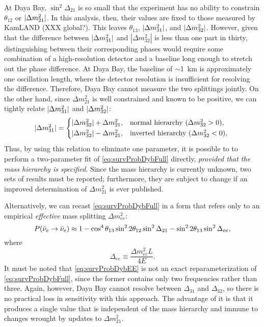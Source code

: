 \documentclass[../thesis.tex]{subfiles}
\begin{document}
At Daya Bay, \(\sin^2 \Delta_{21}\) is so small that the experiment has no ability to constrain $\theta_{12}$ or \(\lvert \Delta m^2_{21}\rvert\). In this analysis, then, their values are fixed to those measured by KamLAND (XXX global?). This leaves $\theta_{13}$, \(\lvert \Delta m^2_{31}\rvert\), and \(\lvert \Delta m^2_{32}\rvert\). However, given that the difference between \(\lvert \Delta m^2_{31}\rvert\) and \(|\Delta m^2_{32}|\) is less than one part in thirty, distinguishing between their corresponding phases would require some combination of a high-resolution detector and a baseline long enough to stretch out the phase difference. At Daya Bay, the baseline of $\sim$1~km is approximately one oscillation length, where the detector resolution is insufficient for resolving the difference. Therefore, Daya Bay cannot measure the two splittings jointly. On the other hand, since \(\Delta m^2_{21}\) is well constrained and known to be positive, we can tightly relate \(\lvert \Delta m^2_{31}\rvert\) and \(\lvert \Delta m^2_{32}\rvert\):
\begin{equation*}
  \label{eq:hierarchy}
  \abs{\Delta m^2_{31}} =
  \begin{cases*}
    \abs{\Delta m^2_{32}} + \Delta m^2_{21}, & normal hierarchy ($\Delta m^2_{32} > 0$), \\
    \abs{\Delta m^2_{32}} - \Delta m^2_{21}, & inverted hierarchy ($\Delta m^2_{32} < 0$), \\
  \end{cases*}
\end{equation*}
Thus, by using this relation to eliminate one parameter, it is possible to to perform a two-parameter fit of \eqref{eq:survProbDybFull} directly, \emph{provided that the mass hierarchy is specified}. Since the mass hierarchy is currently unknown, two sets of results must be reported; furthermore, they are subject to change if an improved determination of \(\Delta m^2_{21}\) is ever published.

Alternatively, we can recast \eqref{eq:survProbDybFull} in a form that refers only to an empirical \emph{effective} mass splitting \(\Delta m^2_{ee}\):
\begin{equation}
  \label{eq:survProbDybEE}
  P(\bar\nu_e \rightarrow \bar\nu_e) \approx 1 - \cos^4\theta_{13}\sin^2 2\theta_{12} \sin^2 \Delta_{21}
  - \sin^2 2\theta_{13}\sin^2\Delta_{ee},
\end{equation}
where
\begin{equation*}
  \Delta_{ee} \equiv \frac{\Delta m^2_{ee}L}{4E}. 
\end{equation*}
It must be noted that \eqref{eq:survProbDybEE} is not an exact reparameterization of \eqref{eq:survProbDybFull}, since the former contains only two frequencies rather than three. Again, however, Daya Bay cannot resolve between $\Delta_{31}$ and $\Delta_{32}$, so there is no practical loss in sensitivity with this approach. The advantage of it is that it produces a single value that is independent of the mass hierarchy and immune to changes wrought by updates to \(\Delta m^2_{21}\).
\end{document}
